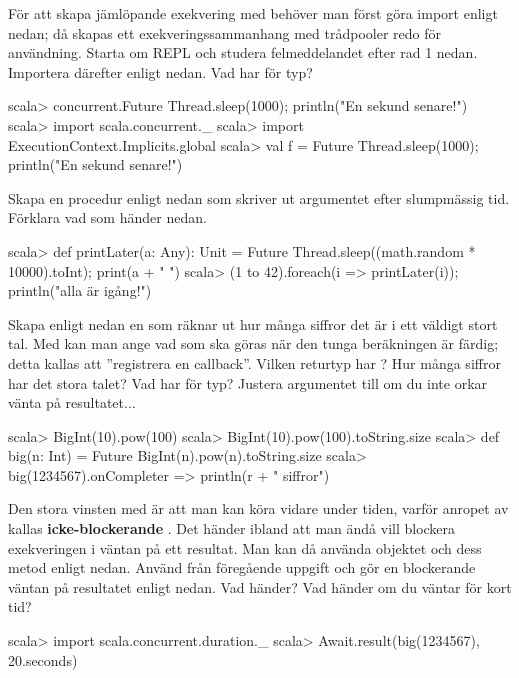 \Subtask För att skapa jämlöpande exekvering med  behöver man först göra import enligt nedan; då skapas ett exekveringssammanhang med trådpooler redo för användning. Starta om REPL och studera felmeddelandet efter rad 1 nedan. Importera därefter enligt nedan. Vad har  för typ? 
\begin{REPL}
scala> concurrent.Future { Thread.sleep(1000); println("En sekund senare!") }
scala> import scala.concurrent._ 
scala> import ExecutionContext.Implicits.global
scala> val f = Future { Thread.sleep(1000); println("En sekund senare!") }
\end{REPL}

\Subtask Skapa en procedur  enligt nedan som skriver ut argumentet efter slumpmässig tid. Förklara vad som händer nedan.
\begin{REPL}
scala> def printLater(a: Any): Unit =  
         Future { Thread.sleep((math.random * 10000).toInt); print(a + " ") }
scala> (1 to 42).foreach(i => printLater(i)); println("alla är igång!")
\end{REPL}

\Subtask Skapa enligt nedan en  som räknar ut hur många siffror det är i ett väldigt stort tal. Med  kan man ange vad som ska göras när den tunga beräkningen är färdig; detta kallas att ''registrera en callback''. Vilken returtyp har ? Hur många siffror har det stora talet? Vad har  för typ? Justera argumentet till  om du inte orkar vänta på resultatet...

\begin{REPL}
scala> BigInt(10).pow(100)
scala> BigInt(10).pow(100).toString.size
scala> def big(n: Int) = Future { BigInt(n).pow(n).toString.size }
scala> big(1234567).onComplete{r => println(r + " siffror") }
\end{REPL} 

\Subtask Den stora vinsten med  är att man kan köra vidare under tiden, varför anropet av  kallas \textbf{icke-blockerande} . Det händer ibland att man ändå vill blockera exekveringen i väntan på ett resultat. Man kan då använda objektet  och dess metod  enligt nedan. Använd  från föregående uppgift och gör en blockerande väntan på resultatet enligt nedan. Vad händer? Vad händer om du väntar för kort tid?

\begin{REPL}
scala> import scala.concurrent.duration._
scala> Await.result(big(1234567), 20.seconds)
\end{REPL} 



